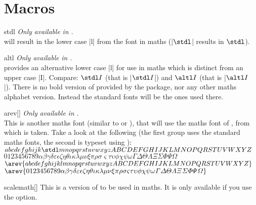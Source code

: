 \section{Macros}\label{sec:fonts:macros}
\begin{describemacro}{stdl}
  \emph{Only available in .}\\
   will result in the lower case |l| from the  font in
  maths (\bverb|$\stdl$| results in $\stdl$).
\end{describemacro}
\begin{describemacro}{altl}
  \emph{Only available in .}\\
   provides an alternative lower case |l| for use in maths which is
  distinct from an upper case |I|. Compare: $\stdl I$ (that is |$\stdl I$|) and
  $\altl I$ (that is |$\altl I$|). There is no bold version of 
  provided by the package, nor any other maths alphabet version. Instead the
  standard fonts will be the ones used there.
\end{describemacro}
\begin{describemacro}{arev}[]
  \emph{Only available in .}\\
  This is another maths font (similar to  or ), that will
  use the maths font of , from which  is taken. Take a
  look at the following (the first group uses the standard maths fonts, the
  second is typeset using ):\\[\parskip]
  $abcdefghijk\stdl mnopqrstuvwxyzABCDEFGHIJKLMNOPQRSTUVWXYZ$\\
  $
    0123456789
    \alpha\beta\gamma\delta\varepsilon\epsilon\zeta\eta\theta\iota\kappa\lambda
    \mu\nu\xi\pi\rho\sigma\varsigma\tau\upsilon\phi\chi\psi\omega
    \Gamma\Delta\Theta\Lambda\Xi\Sigma\Phi\Psi\Omega
  $\\[\parskip]
  $\arev{abcdefghijklmnopqrstuvwxyzABCDEFGHIJKLMNOPQRSTUVWXYZ}$\\
  $\arev{
    0123456789
    \alpha\beta\gamma\delta\varepsilon\epsilon\zeta\eta\theta\iota\kappa\lambda
    \mu\nu\xi\pi\rho\sigma\varsigma\tau\upsilon\phi\chi\psi\omega
    \Gamma\Delta\Theta\Lambda\Xi\Sigma\Phi\Psi\Omega
  }$
\end{describemacro}
\begin{describemacro}{scalemath}[]
  This is a version of  to be used in maths. It is only available
  if you use the  option.
\end{describemacro}

